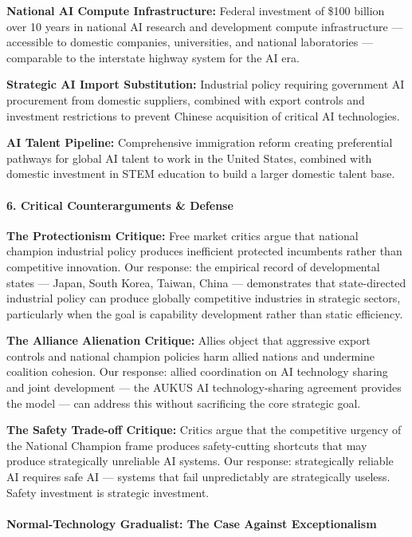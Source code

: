 \textbf{National AI Compute Infrastructure:} Federal investment of \$100
billion over 10 years in national AI research and development compute
infrastructure --- accessible to domestic companies, universities, and
national laboratories --- comparable to the interstate highway system
for the AI era.

\textbf{Strategic AI Import Substitution:} Industrial policy requiring
government AI procurement from domestic suppliers, combined with export
controls and investment restrictions to prevent Chinese acquisition of
critical AI technologies.

\textbf{AI Talent Pipeline:} Comprehensive immigration reform creating
preferential pathways for global AI talent to work in the United States,
combined with domestic investment in STEM education to build a larger
domestic talent base.

\paragraph{6. Critical Counterarguments \&
Defense}\label{critical-counterarguments-defense-19}

\textbf{The Protectionism Critique:} Free market critics argue that
national champion industrial policy produces inefficient protected
incumbents rather than competitive innovation. Our response: the
empirical record of developmental states --- Japan, South Korea, Taiwan,
China --- demonstrates that state-directed industrial policy can produce
globally competitive industries in strategic sectors, particularly when
the goal is capability development rather than static efficiency.

\textbf{The Alliance Alienation Critique:} Allies object that aggressive
export controls and national champion policies harm allied nations and
undermine coalition cohesion. Our response: allied coordination on AI
technology sharing and joint development --- the AUKUS AI
technology-sharing agreement provides the model --- can address this
without sacrificing the core strategic goal.

\textbf{The Safety Trade-off Critique:} Critics argue that the
competitive urgency of the National Champion frame produces
safety-cutting shortcuts that may produce strategically unreliable AI
systems. Our response: strategically reliable AI requires safe AI ---
systems that fail unpredictably are strategically useless. Safety
investment is strategic investment.

\paragraph{Normal-Technology Gradualist: The Case Against
Exceptionalism}\label{normal-technology-gradualist-the-case-against-exceptionalism}

